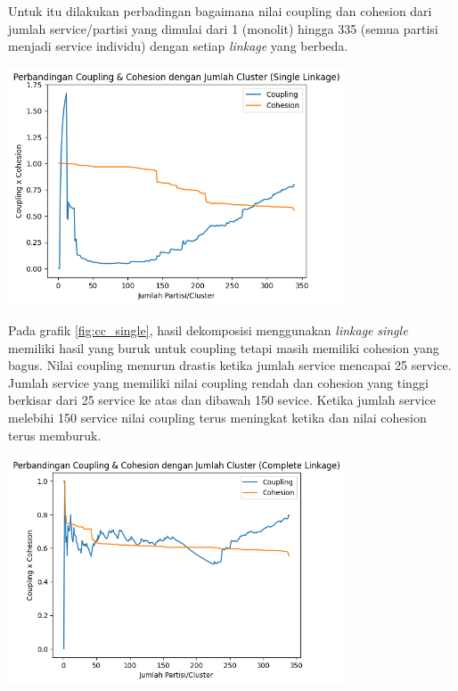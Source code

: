 Untuk itu dilakukan perbadingan bagaimana nilai coupling dan cohesion dari jumlah service/partisi yang dimulai dari 1 (monolit) hingga 335 (semua partisi menjadi service individu) dengan setiap \textit{linkage} yang berbeda.

\begin{center}
	\includegraphics[width=10cm]{img/bab_4/cc_single.png}
	\label{fig:cc_single}
\end{center}

 Pada grafik \ref{fig:cc_single}, hasil dekomposisi menggunakan \textit{linkage} \textit{single} memiliki hasil yang buruk untuk coupling tetapi masih memiliki cohesion yang bagus. Nilai coupling menurun drastis ketika jumlah service mencapai 25 service. Jumlah service yang memiliki nilai coupling rendah dan cohesion yang tinggi berkisar dari 25 service ke atas dan dibawah 150 sevice. Ketika jumlah service melebihi 150 service nilai coupling terus meningkat ketika dan nilai cohesion terus memburuk.
 
\begin{center}
	\includegraphics[width=10cm]{img/bab_4/cc_comp.png}
	\label{fig:cc_complete}
\end{center}

